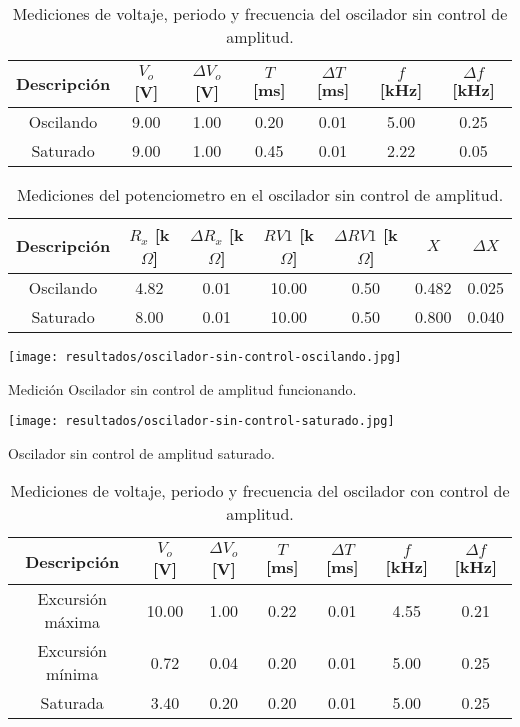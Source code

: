\begin{table}[ht]
\centering
\begin{tabular}{|c|c|c|c|c|c|c|}
\hline
Descripción & \(V_o\) [V] & \(\Delta V_o\) [V] & \(T\) [ms] & \(\Delta T\) [ms] & \(f\) [kHz] & \(\Delta f\) [kHz] \\ \hline
Oscilando & 9.00 & 1.00 & 0.20 & 0.01 & 5.00 & 0.25 \\ \hline
Saturado & 9.00 & 1.00 & 0.45 & 0.01 & 2.22 & 0.05 \\ \hline
\end{tabular}
\caption{Mediciones de voltaje, periodo y frecuencia del oscilador sin control de amplitud.}
\label{tab:mediciones-voltaje-periodo-oscilador-sin-control}
\end{table}


\begin{table}[ht]
\centering
\begin{tabular}{|c|c|c|c|c|c|c|}
\hline
Descripción & \(R_x\) [k\(\Omega\)] & \(\Delta R_x\) [k\(\Omega\)] & \(RV1\) [k\(\Omega\)] & \(\Delta RV1\) [k\(\Omega\)] & \(X\) & \(\Delta X\) \\ \hline
Oscilando & 4.82 & 0.01 & 10.00 & 0.50 & 0.482 & 0.025 \\ \hline
Saturado & 8.00 & 0.01 & 10.00 & 0.50 & 0.800 & 0.040 \\ \hline
\end{tabular}
\caption{Mediciones del potenciometro en el oscilador sin control de amplitud.}
\label{tab:mediciones-resistencia-oscilador-sin-control}
\end{table}


\begin{ilustracion}[ht]
    \centering
    \texttt{[image: resultados/oscilador-sin-control-oscilando.jpg]}
    \caption{Medición Oscilador sin control de amplitud funcionando.}
    \label{fig:oscilador-sin-control-oscilando}   
\end{ilustracion}

\begin{ilustracion}[ht]
    \centering
    \texttt{[image: resultados/oscilador-sin-control-saturado.jpg]}
    \caption{Oscilador sin control de amplitud saturado.}
    \label{fig:oscilador-sin-control-saturado}   
\end{ilustracion}

\begin{table}[ht]
\centering
\begin{tabular}{|c|c|c|c|c|c|c|}
\hline
Descripción & \(V_o\) [V] & \(\Delta V_o\) [V] & \(T\) [ms] & \(\Delta T\) [ms] & \(f\) [kHz] & \(\Delta f\) [kHz] \\ \hline
Excursión máxima & 10.00 & 1.00 & 0.22 & 0.01 & 4.55 & 0.21 \\ \hline
Excursión mínima & 0.72 & 0.04 & 0.20 & 0.01 & 5.00 & 0.25 \\ \hline
Saturada & 3.40 & 0.20 & 0.20 & 0.01 & 5.00 & 0.25 \\ \hline
\end{tabular}
\caption{Mediciones de voltaje, periodo y frecuencia del oscilador con control de amplitud.}
\label{tab:mediciones-voltaje-periodo-frecuencia-oscilador-con-control}
\end{table}


